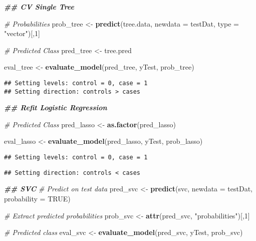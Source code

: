 \documentclass[
]{article}
\newenvironment{Shaded}{\begin{snugshade}}{\end{snugshade}}
\newcommand{\AttributeTok}[1]{\textcolor[rgb]{0.13,0.29,0.53}{#1}}
\newcommand{\CommentTok}[1]{\textcolor[rgb]{0.56,0.35,0.01}{\textit{#1}}}
\newcommand{\ConstantTok}[1]{\textcolor[rgb]{0.56,0.35,0.01}{#1}}
\newcommand{\DecValTok}[1]{\textcolor[rgb]{0.00,0.00,0.81}{#1}}
\newcommand{\DocumentationTok}[1]{\textcolor[rgb]{0.56,0.35,0.01}{\textbf{\textit{#1}}}}
\newcommand{\FunctionTok}[1]{\textcolor[rgb]{0.13,0.29,0.53}{\textbf{#1}}}
\newcommand{\NormalTok}[1]{#1}
\newcommand{\OtherTok}[1]{\textcolor[rgb]{0.56,0.35,0.01}{#1}}
\newcommand{\StringTok}[1]{\textcolor[rgb]{0.31,0.60,0.02}{#1}}
\begin{document}
\begin{Shaded}
\begin{Highlighting}[]
\DocumentationTok{\#\# CV Single Tree}

\CommentTok{\# Probabilities}
\NormalTok{prob\_tree }\OtherTok{\textless{}{-}} \FunctionTok{predict}\NormalTok{(tree.data, }\AttributeTok{newdata =}\NormalTok{ testDat, }\AttributeTok{type =} \StringTok{"vector"}\NormalTok{)[,}\DecValTok{1}\NormalTok{]}

\CommentTok{\# Predicted Class}
\NormalTok{pred\_tree }\OtherTok{\textless{}{-}}\NormalTok{ tree.pred}

\NormalTok{eval\_tree }\OtherTok{\textless{}{-}} \FunctionTok{evaluate\_model}\NormalTok{(pred\_tree, yTest, prob\_tree)}
\end{Highlighting}
\end{Shaded}

\begin{verbatim}
## Setting levels: control = 0, case = 1
## Setting direction: controls > cases
\end{verbatim}

\begin{Shaded}
\begin{Highlighting}[]
\DocumentationTok{\#\# Refit Logistic Regression}

\CommentTok{\# Predicted Class}
\NormalTok{pred\_lasso }\OtherTok{\textless{}{-}} \FunctionTok{as.factor}\NormalTok{(pred\_lasso)}

\NormalTok{eval\_lasso }\OtherTok{\textless{}{-}} \FunctionTok{evaluate\_model}\NormalTok{(pred\_lasso, yTest, prob\_lasso)}
\end{Highlighting}
\end{Shaded}

\begin{verbatim}
## Setting levels: control = 0, case = 1
\end{verbatim}

\begin{verbatim}
## Setting direction: controls < cases
\end{verbatim}

\begin{Shaded}
\begin{Highlighting}[]
\DocumentationTok{\#\# SVC}
\CommentTok{\# Predict on test data}
\NormalTok{pred\_svc }\OtherTok{\textless{}{-}} \FunctionTok{predict}\NormalTok{(svc, }\AttributeTok{newdata =}\NormalTok{ testDat, }\AttributeTok{probability =} \ConstantTok{TRUE}\NormalTok{)}

\CommentTok{\# Extract predicted probabilities}
\NormalTok{prob\_svc }\OtherTok{\textless{}{-}} \FunctionTok{attr}\NormalTok{(pred\_svc, }\StringTok{"probabilities"}\NormalTok{)[,}\DecValTok{1}\NormalTok{]}

\CommentTok{\# Predicted class}
\NormalTok{eval\_svc }\OtherTok{\textless{}{-}} \FunctionTok{evaluate\_model}\NormalTok{(pred\_svc, yTest, prob\_svc)}
\end{Highlighting}
\end{Shaded}
\end{document}
